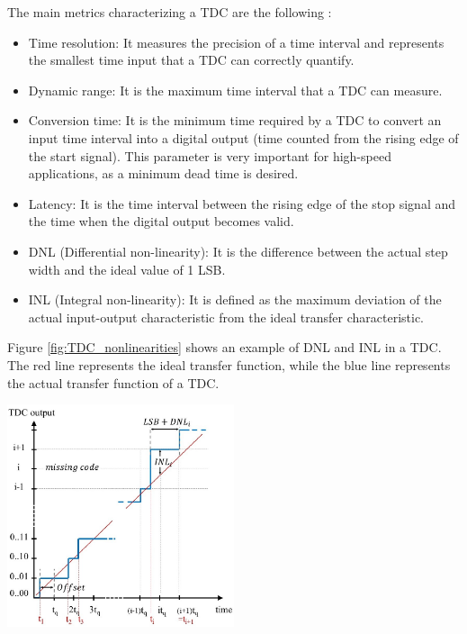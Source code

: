 The main metrics characterizing a TDC are the following \cite{EL-Hadbi_TDC_review_2019}:
\begin{itemize}
    \item Time resolution: It measures the precision of a time interval and represents the smallest time input that a TDC can correctly quantify.
    \item Dynamic range: It is the maximum time interval that a TDC can measure.
    \item Conversion time: It is the minimum time required by a TDC to convert an input time interval into a digital output (time counted from the rising edge of the start signal). This
    parameter is very important for high-speed applications, as a minimum dead time is desired.
    \item Latency: It is the time interval between the rising edge of the stop signal and the time when the digital output becomes valid.
    \item DNL (Differential non-linearity): It is the difference between the actual step width and the ideal value of 1 LSB.
    \item INL (Integral non-linearity): It is defined as the maximum deviation of the actual input-output characteristic from the ideal transfer characteristic.
\end{itemize}

Figure \ref{fig:TDC_nonlinearities} shows an example of DNL and INL in a TDC. The red line represents the ideal transfer function, while the blue line represents the actual transfer
function of a TDC.

\begin{center}
    \includegraphics[width=0.5\textwidth]{figures/TDC_nonlinearities.png}
    \label{fig:TDC_nonlinearities}
\end{center}

